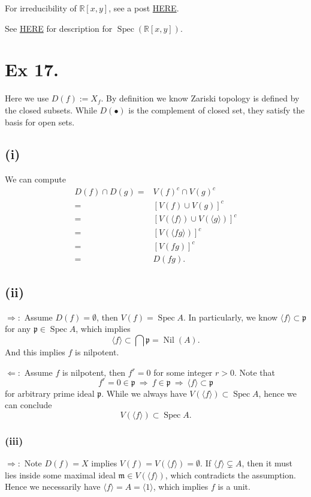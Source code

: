 For irreducibility of $\mathbb R[x,y]$, see a post \href{https://math.stackexchange.com/questions/125146/irreducibility-of-a-polynomial-in-the-ring-mathbbrx-y}{HERE}.

See \href{https://math.stackexchange.com/questions/1281142/what-are-the-closed-points-of-mathbba-mathbbr2-operatornamespec}{HERE} for description for $\operatorname{Spec}(\mathbb R[x,y])$. 



\section{Ex 17.}\label{Atiyah Chapter 1 Ex 17.}
Here we use $D(f):=X_{f}$.
By definition we know Zariski topology is defined by the closed subsets. While $D(\bullet)$ is the complement of closed set, they satisfy the basis for open sets. 
\subsection{(i)}
We can compute \begin{align*}
    D(f)\cap D(g) =& V(f)^c \cap V(g)^c\\
    =& [V(f)\cup V(g)]^c\\
    =& [V(\langle f\rangle)\cup V(\langle g\rangle)]^c\\
    =& [V(\langle fg\rangle)]^c\\
    =& [V(fg)]^c\\
    =& D(fg).
\end{align*}
\subsection{(ii)}
$\Rightarrow:$ Assume $D(f)=\emptyset$, then $V(f)=\operatorname{Spec}A$. In particularly, we know $\langle f\rangle\subset \mathfrak p$ for any $\mathfrak p\in \operatorname{Spec}A$, which implies 
$$\langle f\rangle \subset \bigcap \mathfrak p=\operatorname{Nil}(A).$$ And this implies $f$ is nilpotent.

$\Leftarrow:$ Assume $f$ is nilpotent, then $f^r=0$ for some integer $r>0$. Note that 
$$f^r=0\in\mathfrak p ~\Rightarrow~ f\in\mathfrak p ~\Rightarrow~ \langle f\rangle \subset \mathfrak p$$ for arbitrary prime ideal $\mathfrak p$. While we always have $V(\langle f\rangle)\subset\operatorname{Spec}A$, hence we can conclude $$V(\langle f\rangle)\subset\operatorname{Spec}A.$$
\subsubsection{(iii)}
$\Rightarrow:$ Note $D(f)=X$ implies $V(f)=V(\langle f\rangle)=\emptyset$. If $\langle f\rangle\subsetneq A$, then it must lies inside some maximal ideal $\mathfrak m\in V(\langle f\rangle)$, which contradicts the assumption. Hence we necessarily have $\langle f\rangle =A=\langle 1\rangle$, which implies $f$ is a unit. 

